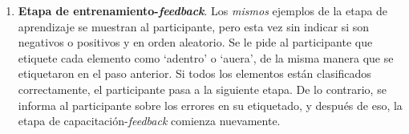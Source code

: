 \begin{enumerate}
    \item {\bf Etapa de entrenamiento-{\em feedback}}. Los {\em mismos} ejemplos de la etapa de aprendizaje se muestran al participante, pero esta vez sin indicar si son negativos o positivos y en orden aleatorio. Se le pide al participante que etiquete cada elemento como `adentro' o `auera', de la misma manera que se etiquetaron en el paso anterior. Si todos los elementos están clasificados correctamente, el participante pasa a la siguiente etapa. De lo contrario, se informa al participante sobre los errores en su etiquetado, y después de eso, la etapa de capacitación-{\em feedback} comienza nuevamente.



\end{enumerate}

